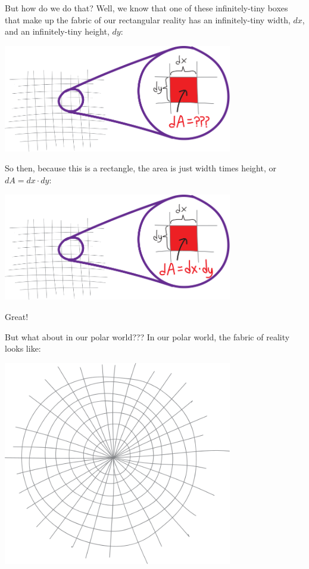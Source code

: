 \documentclass[
]{article}
\begin{document}
But how do we do that? Well, we know that one of these infinitely-tiny boxes that make up the fabric of our rectangular reality has an infinitely-tiny width, \(dx\), and an infinitely-tiny height, \(dy\):

\includegraphics[width=0.75\textwidth,height=\textheight]{rectangular-world-4.svg}

So then, because this is a rectangle, the area is just width times height, or \(dA = dx\cdot dy\):

\includegraphics[width=0.75\textwidth,height=\textheight]{rectangular-world-5.svg}

Great!

But what about in our polar world??? In our polar world, the fabric of reality looks like:

\includegraphics[width=0.75\textwidth,height=\textheight]{polar-world-1.svg}
\end{document}
